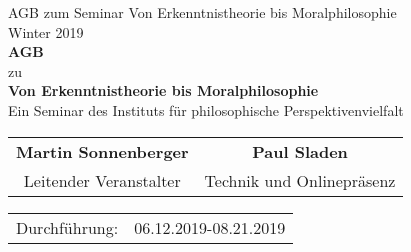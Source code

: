 \documentclass[a4paper, 12pt]{scrartcl}
\begin{document}
    \begin{titlepage}
        \begin{center}
            
	    \large {AGB zum Seminar {\dq}Von Erkenntnistheorie bis Moralphilosophie{\dq}} \\
            Winter 2019 \\
            \vspace{3cm}
            \textbf{ \Huge AGB} \\
            \vspace{0.5cm}
            \large zu \\
            \vspace{1.5cm}
            \textbf{ \Large Von Erkenntnistheorie bis Moralphilosophie} \\
            \large Ein Seminar des Instituts f\"ur philosophische Perspektivenvielfalt

            \vspace{3cm}

            \begin{tabularx}{\textwidth}{CC}
            \textbf{Martin Sonnenberger} & \textbf{Paul Sladen} \\
            Leitender Veranstalter & Technik und Onlinepr\"asenz\\
            \end{tabularx}
           
            \vfill
            
            \begin{tabularx}{\textwidth}{XX}
                Durchführung: & 06.12.2019-08.21.2019
            \end{tabularx}
         \end{center}
    \end{titlepage}
\end{document}
